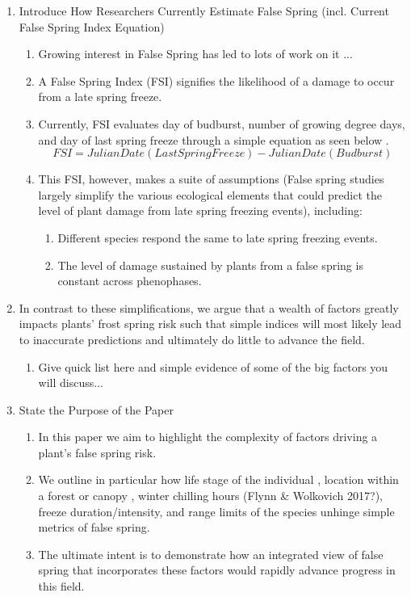 \documentclass{article}\usepackage[]{graphicx}\usepackage[]{color}
\begin{document}
\begin{enumerate}
\item Introduce How Researchers Currently Estimate False Spring (incl. Current False Spring Index Equation)
\begin{enumerate}
\item Growing interest in False Spring has led to lots of work on it ... 
\item A False Spring Index (FSI) signifies the likelihood of a damage to occur from a late spring freeze. 
\item Currently, FSI evaluates day of budburst, number of growing degree days, and day of last spring freeze through a simple equation as seen below \citep{Marino2011}. 
\begin{equation} \label{eq:1}
FSI = Julian Date (Last Spring Freeze) - Julian Date (Budburst)
\end{equation}
\item This FSI, however, makes a suite of assumptions (False spring studies largely simplify the various ecological elements that could predict the level of plant damage from late spring freezing events), including:
\begin{enumerate}
\item Different species respond the same to late spring freezing events. 
\item The level of damage sustained by plants from a false spring is constant across phenophases. 
\end{enumerate}
\end{enumerate}
\item In contrast to these simplifications, we argue that a wealth of factors greatly impacts plants' frost spring risk such that simple indices will most likely lead to inaccurate predictions and ultimately do little to advance the field. 
\begin{enumerate}
\item Give quick list here and simple evidence of some of the big factors you will discuss... 
\end{enumerate}

\item State the Purpose of the Paper
\begin{enumerate}
\item In this paper we aim to highlight the complexity of factors driving a plant's false spring risk. 
\item We outline in particular how life stage of the individual \citep{Caffarra2011}, location within a forest or canopy \citep{Augspurger2013}, winter chilling hours (Flynn \& Wolkovich 2017?), freeze duration/intensity, and range limits of the species \citep{Martin2010} unhinge simple metrics of false spring. 
\item The ultimate intent is to demonstrate how an integrated view of false spring that incorporates these factors would rapidly advance progress in this field.  
\end{enumerate}
\end{enumerate}
\end{document}
